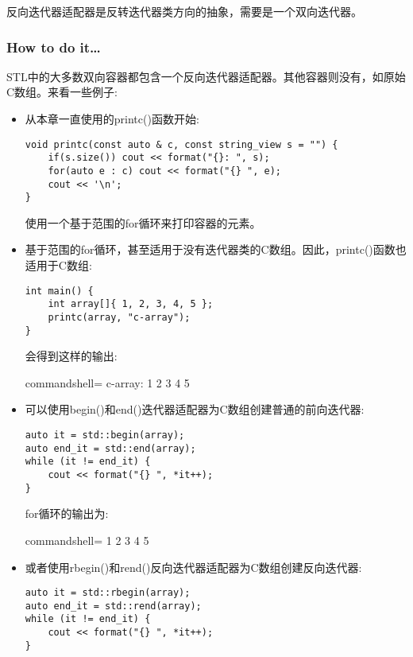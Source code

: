
反向迭代器适配器是反转迭代器类方向的抽象，需要是一个双向迭代器。

\subsubsection{How to do it…}

STL中的大多数双向容器都包含一个反向迭代器适配器。其他容器则没有，如原始C数组。来看一些例子:

\begin{itemize}
\item 
从本章一直使用的printc()函数开始:

\begin{lstlisting}[style=styleCXX]
void printc(const auto & c, const string_view s = "") {
	if(s.size()) cout << format("{}: ", s);
	for(auto e : c) cout << format("{} ", e);
	cout << '\n';
}
\end{lstlisting}

使用一个基于范围的for循环来打印容器的元素。

\item 
基于范围的for循环，甚至适用于没有迭代器类的C数组。因此，printc()函数也适用于C数组:

\begin{lstlisting}[style=styleCXX]
int main() {
	int array[]{ 1, 2, 3, 4, 5 };
	printc(array, "c-array");
}
\end{lstlisting}

会得到这样的输出:

\begin{tcblisting}{commandshell={}}
c-array: 1 2 3 4 5
\end{tcblisting}

\item 
可以使用begin()和end()迭代器适配器为C数组创建普通的前向迭代器:

\begin{lstlisting}[style=styleCXX]
auto it = std::begin(array);
auto end_it = std::end(array);
while (it != end_it) {
	cout << format("{} ", *it++);
}
\end{lstlisting}

for循环的输出为:

\begin{tcblisting}{commandshell={}}
1 2 3 4 5
\end{tcblisting}

\item 
或者使用rbegin()和rend()反向迭代器适配器为C数组创建反向迭代器:

\begin{lstlisting}[style=styleCXX]
auto it = std::rbegin(array);
auto end_it = std::rend(array);
while (it != end_it) {
	cout << format("{} ", *it++);
}
\end{lstlisting}


\end{itemize}
